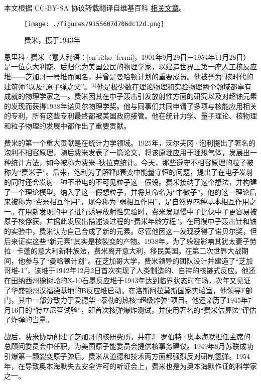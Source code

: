 
本文根据 CC-BY-SA 协议转载翻译自维基百科 \href{https://en.wikipedia.org/wiki/Enrico_Fermi}{相关文章}。

\begin{figure}[ht]
\centering
\texttt{[image: ./figures/9155607d706dc12d.png]}
\caption{费米，摄于1943年} \label{fig_ELK_16}
\end{figure}
恩里科·费米（意大利语：[enˈriːko ˈfermi]，1901年9月29日－1954年11月28日）是一位意大利裔、后归化为美国公民的物理学家，以建造世界上第一座人工核反应堆——芝加哥一号堆而闻名，并曾是曼哈顿计划的重要成员。他被誉为“核时代的建筑师”以及“原子弹之父”。\(^\text{[1]}\)他是极少数在理论物理和实验物理两个领域都卓有成就的物理学家之一。费米因其在中子轰击引发放射性方面的研究以及对超铀元素的发现而获得1938年诺贝尔物理学奖。他与同事们共同申请了多项与核能应用相关的专利，所有这些专利最终都被美国政府接管。他在统计力学、量子理论、核物理和粒子物理的发展中都作出了重要贡献。

费米的第一个重大贡献是在统计力学领域。1925年，沃尔夫冈·泡利提出了著名的泡利不相容原理，随后费米发表了一篇论文，将该原理应用于理想气体，发展出一种统计方法，如今被称为费米–狄拉克统计。今天，那些遵守不相容原理的粒子被称为“费米子”。后来，泡利为了解释β衰变中能量守恒的问题，提出了在电子发射的同时还会发射一种不带电的不可见粒子这一假设。费米接纳了这个想法，并构建了一个理论模型，纳入了这一假想粒子，并将其命名为“中微子”。他的这一理论后来被称为“费米相互作用”，现今称为“弱相互作用”，是自然界四种基本相互作用之一。在用新发现的中子进行诱导放射性实验时，费米发现慢中子比快中子更容易被原子核俘获，并据此发展出描述该过程的“费米年龄方程”。在用慢中子轰击钍和铀的实验中，费米认为自己合成了新的元素。尽管他因这一发现获得了诺贝尔奖，但后来证实这些“新元素”其实是核裂变的产物。1938年，为了躲避影响其犹太妻子劳拉·卡蓬的意大利新种族法，费米离开意大利，移民美国。在第二次世界大战期间，他参与了“曼哈顿计划”。在芝加哥大学，费米领导的团队设计并建造了“芝加哥堆-1”，该堆于1942年12月2日首次实现了人类制造的、自持的核链式反应。他还在田纳西州橡树岭的X-10石墨反应堆于1943年达到临界状态时在场，次年又见证了华盛顿州汉福德基地的B反应堆启动。在洛斯阿拉莫斯国家实验室，他领导F部门，其中一部分致力于爱德华·泰勒的热核“超级炸弹”项目。他还亲历了1945年7月16日的“特立尼蒂试验”，即首次核弹爆炸测试，并使用著名的“费米估算法”评估了炸弹的当量。

战后，费米协助创建了芝加哥的核研究所，并在J·罗伯特·奥本海默担任主席的总顾问委员会中任职，为美国原子能委员会提供核事务建议。1949年8月苏联成功引爆第一颗裂变原子弹后，费米从道德和技术两方面都强烈反对研制氢弹。1954年，在导致奥本海默失去安全许可的听证会上，费米也是为奥本海默作证的科学家之一。

